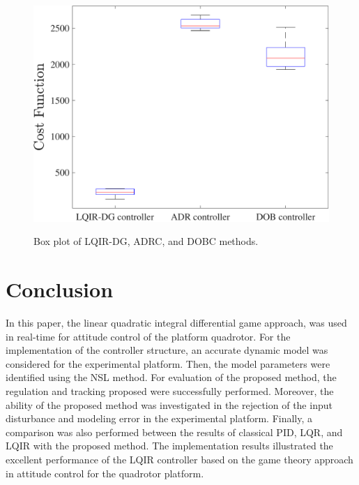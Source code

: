 \documentclass[3p]{elsarticle}
\begin{document}
\begin{figure}[H]
    \centering
    {\includegraphics[width=.55\linewidth]{../Figure/implementation/box_plot/lqidgvsboxplot_ADR}
    }
    \caption{Box plot of LQIR-DG, ADRC, and DOBC methods.}
    \label{fig:compare_boxplot_ADR}
\end{figure}


\newpage

\section{Conclusion}\label{sec:conclusion}
\vspace{-0.15cm}
\noindent In this paper, the linear quadratic integral differential game approach, was used in real-time for attitude control of the platform quadrotor. %
For the implementation of the controller structure, an accurate dynamic model was considered for the experimental platform.
Then, the model parameters were identified using the NSL method.
For evaluation of the proposed method, the regulation and tracking proposed were successfully performed.
Moreover, the ability of the proposed method was investigated in the rejection of the input disturbance and modeling error in the experimental platform.
Finally, a comparison
was also performed between the results of classical PID, LQR, and LQIR with the proposed method.
The implementation results illustrated the excellent performance of the LQIR controller based on the game theory approach in attitude control for the quadrotor platform.



\end{document}
